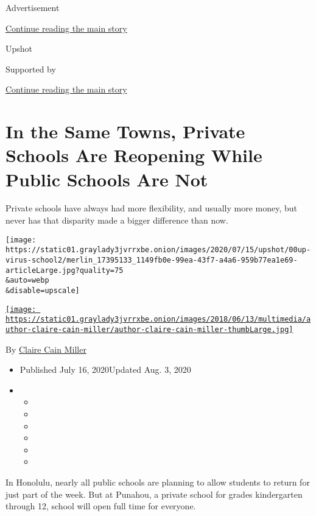 Advertisement

\protect\hyperlink{after-top}{Continue reading the main story}

Upshot

Supported by

\protect\hyperlink{after-sponsor}{Continue reading the main story}

\hypertarget{in-the-same-towns-private-schools-are-reopening-while-public-schools-are-not}{%
\section{In the Same Towns, Private Schools Are Reopening While Public
Schools Are
Not}\label{in-the-same-towns-private-schools-are-reopening-while-public-schools-are-not}}

Private schools have always had more flexibility, and usually more
money, but never has that disparity made a bigger difference than now.

\texttt{[image: https://static01.graylady3jvrrxbe.onion/images/2020/07/15/upshot/00up-virus-school2/merlin\_17395133\_1149fb0e-99ea-43f7-a4a6-959b77ea1e69-articleLarge.jpg?quality=75\\\&auto=webp\\\&disable=upscale]}

\href{https://www.nytimes3xbfgragh.onion/by/claire-cain-miller}{\texttt{[image: https://static01.graylady3jvrrxbe.onion/images/2018/06/13/multimedia/author-claire-cain-miller/author-claire-cain-miller-thumbLarge.jpg]}}

By
\href{https://www.nytimes3xbfgragh.onion/by/claire-cain-miller}{Claire
Cain Miller}

\begin{itemize}
\item
  Published July 16, 2020Updated Aug. 3, 2020
\item
  \begin{itemize}
  \item
  \item
  \item
  \item
  \item
  \item
  \end{itemize}
\end{itemize}

In Honolulu, nearly all public schools are planning to allow students to
return for just part of the week. But at Punahou, a private school for
grades kindergarten through 12, school will open full time for everyone.

